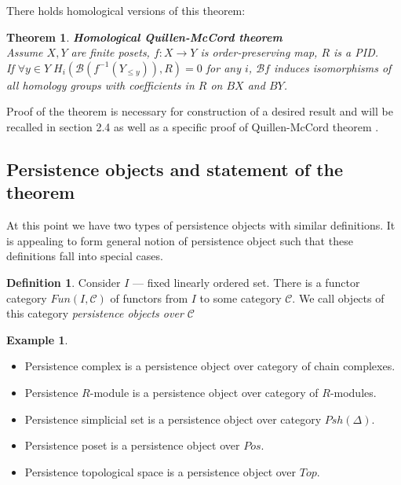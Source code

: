 \documentclass[a4paper, 12pt]{article}
\newtheorem{theorem}{Theorem}
\theoremstyle{definition}
\newtheorem{definition}{Definition}
\newtheorem{example}{Example}
\theoremstyle{remark}
\newcommand{\define}[1]{{\textit{#1}}}
\begin{document}
There holds homological {\cite[Corollary 5.5]{Bar11}} versions of this theorem:

\begin{theorem} \textbf{Homological Quillen-McCord theorem}\\
  Assume $X, Y$ are finite posets, $f : X \to Y$ is order-preserving map, $R$ is a PID.\\
  If $\forall y \in Y\;H_i(\mathcal{B}(f^{-1}(Y_{\leqslant y})),R) = 0$ for any $i$, $\mathcal{B}f$ induces isomorphisms of all homology groups with coefficients in $R$ on $BX$ and $BY$.\\
\end{theorem}

Proof of the theorem is necessary for construction of a desired result and will be recalled in section 2.4 as well as a specific proof of Quillen-McCord theorem {\cite[Proof of Theorem 1.1]{Bar11}}.\\

\subsection{Persistence objects and statement of the theorem}

At this point we have two types of persistence objects with similar definitions. It is appealing to form general notion of persistence object such that these definitions fall into special cases.\\

\begin{definition}
  Consider $I$ --- fixed linearly ordered set. There is a functor category $Fun(I, \mathcal{C})$ of functors from $I$ to some category $\mathcal{C}$. We call objects of this category \define{persistence objects over $\mathcal{C}$}
\end{definition}

\begin{example}
  \begin{itemize}
    \item Persistence complex is a persistence object over category of chain complexes.
    \item Persistence $R$-module is a persistence object over category of $R$-modules.
    \item Persistence simplicial set is a persistence object over category $Psh(\Delta)$.
    \item Persistence poset is a persistence object over $Pos$.
    \item Persistence topological space is a persistence object over $Top$.
  \end{itemize}
\end{example}
\end{document}

